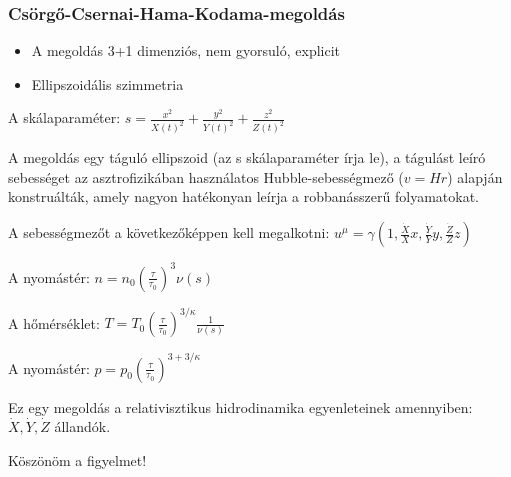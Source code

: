 \documentclass{beamer}
\begin{document}
\begin{frame}
\frametitle{Csörgő-Csernai-Hama-Kodama-megoldás}
\begin{itemize}
\item A megoldás 3+1 dimenziós, nem gyorsuló, explicit
\item Ellipszoidális szimmetria

\end{itemize}
A skálaparaméter: $s=\frac{x^2}{X(t)^2}+\frac{y^2}{Y(t)^2}+\frac{z^2}{Z(t)^2}$

A megoldás egy táguló ellipszoid (az s skálaparaméter írja le), a tágulást leíró sebességet az asztrofizikában használatos Hubble-sebességmező ($v=Hr$) alapján konstruálták, amely nagyon hatékonyan leírja a robbanásszerű folyamatokat.

A sebességmezőt a következőképpen kell megalkotni: $u^\mu=\gamma(1,\frac{\dot{X}}{X}x, \frac{\dot{Y}}{Y}y, \frac{\dot{Z}}{Z}z)$

A nyomástér: $n=n_0(\frac{\tau}{\tau_0})^3\nu(s)$

A hőmérséklet: $T=T_0(\frac{\tau}{\tau_0})^{3/\kappa}\frac{1}{\nu(s)}$

A nyomástér: $p=p_0(\frac{\tau}{\tau_0})^{3+3/\kappa}$

Ez egy megoldás a relativisztikus hidrodinamika egyenleteinek amennyiben: $\dot{X},\dot{Y},\dot{Z}$ állandók.

\end{frame}

\begin{frame}
    \begin{center}
     \vfill
     Köszönöm a figyelmet!
     \end{center}
\end{frame}
\end{document}
